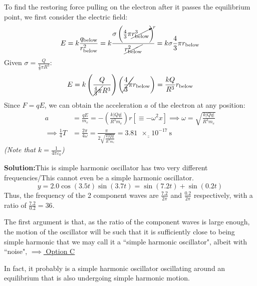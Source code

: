 \documentclass[11pt]{article}
\newcommand*\circled[1]{\tikz[baseline=(char.base)]{
		\node[shape=circle,draw,inner sep=2pt] (char) {#1};}}
\def\doubleunderline#1{\underline{\underline{#1}}}
\newcommand{\solution}[2]{\textbf{Solution:\hspace{1em}\circled{#1}}\hspace{1em}#2\hspace{1em}}
\begin{document}
\begin{enumerate}[label={[Q\arabic*]},itemsep={1em}]
			To find the restoring force pulling on the electron after it passes the equilibrium point, we first consider the electric field:
			\vspace{-0.7em}
			\begin{equation*}
				E = k \frac{q_\text{below}}{r_{\text{below}}^2} = k \frac{\sigma \left(\frac{4}{3}\pi \cancelto{r}{r_\text{below}^3}\right)}{\cancel{r_{\text{below}}^2}} = k\sigma \frac{4}{3} \pi r_\text{below}
				\vspace{-0.7em}
			\end{equation*}
			Given $\displaystyle \sigma = \frac{Q}{\frac{4}{3}\pi R^3}$:
			\vspace{-1em}
			\begin{equation*}
				E = k \left(\frac{Q}{\cancel{\frac{4}{3} \pi} R^3}\right)\left(\cancel{\frac{4}{3} \pi} r_\text{below}\right) = \frac{kQ}{R^3}r_\text{below}
			\end{equation*}
			Since $F = qE$, we can obtain the acceleration $a$ of the electron at any position:
			\begin{align*}
				a &= \frac{qE}{m_e} = -\left(\frac{k|Qq|}{R^3 m_e}\right) r \left[\equiv -\omega^2 x\right] \implies \omega =\sqrt{\frac{k|Qq|}{R^3 m_e}} \\
				\implies \frac{1}{4} T &= \frac{2\pi}{4\omega} = \frac{\pi}{2\sqrt{\frac{k|Qq|}{R^3 m_e}}} = \doubleunderline{\SI{3.81e-17}{\second}}
			\end{align*}
			\textit{(Note that $k = \frac{1}{4\pi\varepsilon_0}$)}
		\pagebreak[4]
		\item \solution{C/D}{This is simple harmonic oscillator has two very different frequencies/This cannot even be a simple harmonic oscillator.}
			\begin{equation*}
				y = 2.0\cos\left(3.5t\right)\sin\left(3.7t\right) = \sin\left(7.2t\right)+\sin\left(0.2t\right)
			\end{equation*}
			Thus, the frequency of the 2 component waves are $\frac{7.2}{2\pi}$ and $\frac{0.2}{2\pi}$ respectively, with a ratio of $\frac{7.2}{0.2} = 36$.
			
			The first argument is that, as the ratio of the component waves is large enough, the motion of the oscillator will be such that it is sufficiently close to being simple harmonic that we may call it a ``simple harmonic oscillator", albeit with ``noise",  \doubleunderline{$\implies$ Option C}
			
			In fact, it probably is a simple harmonic oscillator oscillating around an equilibrium that is also undergoing simple harmonic motion.
			

\end{enumerate}
\end{document}
